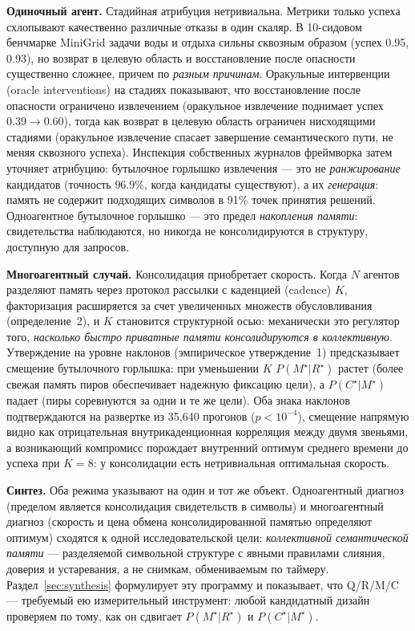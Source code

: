 \documentclass{article}
\begin{document}
\textbf{Одиночный агент.} Стадийная атрибуция нетривиальна.
Метрики только успеха схлопывают качественно различные отказы в
один скаляр. В 10-сидовом бенчмарке MiniGrid задачи воды и отдыха
сильны сквозным образом (успех 0.95, 0.93), но возврат в целевую область и
восстановление после опасности существенно сложнее, причем по \emph{разным
причинам}. Оракульные интервенции (oracle interventions) на стадиях показывают, что восстановление после опасности
ограничено извлечением (оракульное извлечение поднимает успех $0.39 \to 0.60$),
тогда как возврат в целевую область ограничен нисходящими стадиями (оракульное извлечение
спасает завершение семантического пути, не меняя сквозного успеха).
Инспекция собственных журналов фреймворка затем уточняет атрибуцию:
бутылочное горлышко извлечения --- это не \emph{ранжирование} кандидатов (точность
$96.9\%$, когда кандидаты существуют), а их \emph{генерация}: память
не содержит подходящих символов в 91\% точек принятия решений.
Одноагентное бутылочное горлышко --- это предел \emph{накопления памяти}:
свидетельства наблюдаются, но никогда не консолидируются в структуру, доступную для запросов.

\textbf{Многоагентный случай.} Консолидация приобретает скорость.
Когда $N$ агентов разделяют память через протокол рассылки с каденцией (cadence)
$K$, факторизация расширяется за счет увеличенных множеств обусловливания
(определение~2), и $K$ становится структурной осью: механически это
регулятор того, \emph{насколько быстро приватные памяти консолидируются
в коллективную}. Утверждение на уровне наклонов
(эмпирическое утверждение~1) предсказывает смещение бутылочного горлышка: при уменьшении $K$
$P(M^\star|R^\star)$ растет (более свежая память пиров обеспечивает
надежную фиксацию цели), а $P(C^\star|M^\star)$ падает (пиры соревнуются за
одни и те же цели). Оба знака наклонов подтверждаются на развертке из 35{,}640 прогонов
($p < 10^{-4}$), смещение напрямую видно как отрицательная
внутрикаденционная корреляция между двумя звеньями, а возникающий
компромисс порождает внутренний оптимум среднего времени до успеха при
$K\!=\!8$: у консолидации есть нетривиальная оптимальная скорость.

\textbf{Синтез.} Оба режима указывают на один и тот же объект.
Одноагентный диагноз (пределом является консолидация свидетельств в символы)
и многоагентный диагноз (скорость и цена обмена
консолидированной памятью определяют оптимум) сходятся к одной исследовательской
цели: \emph{коллективной семантической памяти} --- разделяемой символьной
структуре с явными правилами слияния, доверия и устаревания, а не
снимкам, обмениваемым по таймеру. Раздел~\ref{sec:synthesis} формулирует
эту программу и показывает, что Q/R/M/C --- требуемый ею измерительный
инструмент: любой кандидатный дизайн проверяем по тому, как он сдвигает
$P(M^\star|R^\star)$ и $P(C^\star|M^\star)$.
\end{document}
